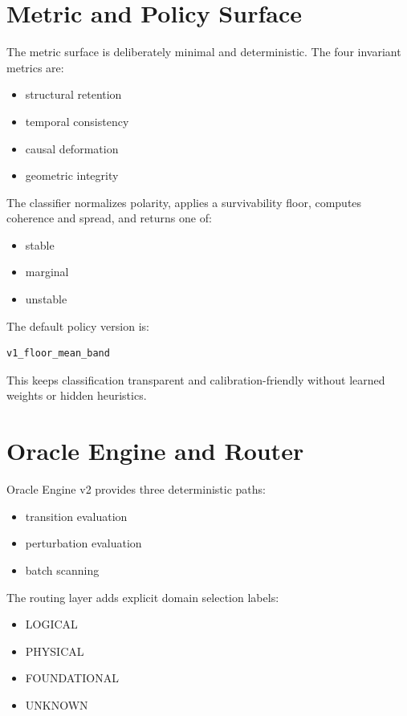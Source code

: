 \documentclass[11pt]{article}
\begin{document}
\section{Metric and Policy Surface}

The metric surface is deliberately minimal and deterministic.
The four invariant metrics are:

\begin{itemize}
\item structural retention
\item temporal consistency
\item causal deformation
\item geometric integrity
\end{itemize}

The classifier normalizes polarity, applies a survivability floor, computes coherence and spread, and returns one of:

\begin{itemize}
\item stable
\item marginal
\item unstable
\end{itemize}

The default policy version is:

\begin{verbatim}
v1_floor_mean_band
\end{verbatim}

This keeps classification transparent and calibration-friendly without learned weights or hidden heuristics.

\section{Oracle Engine and Router}

Oracle Engine v2 provides three deterministic paths:

\begin{itemize}
\item transition evaluation
\item perturbation evaluation
\item batch scanning
\end{itemize}

The routing layer adds explicit domain selection labels:

\begin{itemize}
\item LOGICAL
\item PHYSICAL
\item FOUNDATIONAL
\item UNKNOWN
\end{itemize}
\end{document}
